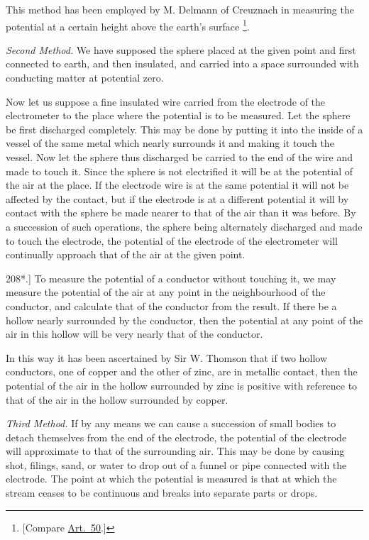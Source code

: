 \documentclass[12pt,oneside]{book}[2021/10/04]
\let\oldfootnote\footnote
\renewcommand\footnote[1]{%
\oldfootnote{\hspace{0.14em}#1}}
\newcommand{\Runhead}[1]{\fancyhead[C]{\iffloatpage{}{\small#1}}}
\newcommand{\article}[1]{\phantomsection \label{art:#1}{#1.]}}
\newcommand{\¬}{\hphantom{0}}
\begin{document}
This method has been employed by M. Delmann of Creuznach in
measuring the potential at a certain height above the earth's
surface\footnote{[Compare \hyperref[art:50]{Art.\ 50}.]}.

\textit{Second Method.} We have supposed the sphere placed at the
given point and first connected to earth, and then insulated, and
carried into a space surrounded with conducting matter at potential
zero.

Now let us suppose a fine insulated wire carried from the electrode
of the electrometer to the place where the potential is to
be measured. Let the sphere be first discharged completely. This
may be done by putting it into the inside of a vessel of the same
metal which nearly surrounds it and making it touch the vessel.
Now let the sphere thus discharged be carried to the end of the
wire and made to touch it. Since the sphere is not electrified it
will be at the potential of the air at the place. If the electrode
wire is at the same potential it will not be affected by the contact,
but if the electrode is at a different potential it will by contact
with the sphere be made nearer to that of the air than it was
before. By a succession of such operations, the sphere being
alternately discharged and made to touch the electrode, the potential
of the electrode of the electrometer will continually approach
that of the air at the given point.

\article{208*} To measure the potential of a conductor without touching
it, we may measure the potential of the air at any point in the
neighbourhood of the conductor, and calculate that of the conductor
from the result. If there be a hollow nearly surrounded by the
conductor, then the potential at any point of the air in this hollow
will be very nearly that of the conductor.
\Runhead{POTENTIAL OF A CONDUCTOR.}

In this way it has been ascertained by Sir W. Thomson that if
two hollow conductors, one of copper and the other of zinc, are
in metallic contact, then the potential of the air in the hollow
surrounded by zinc is positive with reference to that of the air in
the hollow surrounded by copper.

\textit{Third Method.} If by any means we can cause a succession of
small bodies to detach themselves from the end of the electrode,
the potential of the electrode will approximate to that of the surrounding
air. This may be done by causing shot, filings, sand, or
water to drop out of a funnel or pipe connected with the electrode.
The point at which the potential is measured is that at which
the stream ceases to be continuous and breaks into separate parts
or drops.
\end{document}
